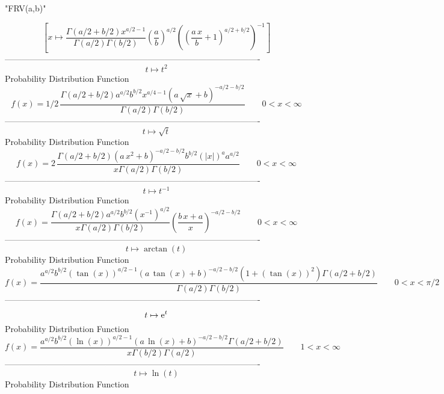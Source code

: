 \documentclass[12pt]{article}
\begin{document}
 
                                 "FRV(a,b)"

$$[x\mapsto {\frac {\Gamma \left( a/2+b/2 \right) {x}^{a/2-1}}{\Gamma
 \left( a/2 \right) \Gamma \left( b/2 \right) } \left( {\frac {a}{b}}
 \right) ^{a/2} \left(  \left( {\frac {a\,x}{b}}+1 \right) ^{a/2+b/2}
 \right) ^{-1}}]
$$-------------------------------------------------------------------------------------------  \\$$t\mapsto {t}^{2}
$$Probability Distribution Function 
$$  f(x)=1/2\,{\frac {\Gamma \left( a/2+b/2 \right) {a}^{a/2}{b}^{b/2}{x}^{a/4-
1} \left( a\,\sqrt {x}+b \right) ^{-a/2-b/2}}{\Gamma \left( a/2
 \right) \Gamma \left( b/2 \right) }}
 \qquad0
 < x < \infty 
$$-------------------------------------------------------------------------------------------  \\$$t\mapsto \sqrt {t}
$$Probability Distribution Function 
$$  f(x)=2\,{\frac {\Gamma \left( a/2+b/2 \right)  \left( a\,{x}^{2}+b \right) 
^{-a/2-b/2}{b}^{b/2} \left(  \left| x \right|  \right) ^{a}{a}^{a/2}}{
x\Gamma \left( a/2 \right) \Gamma \left( b/2 \right) }}
 \qquad0
 < x < \infty 
$$-------------------------------------------------------------------------------------------  \\$$t\mapsto {t}^{-1}
$$Probability Distribution Function 
$$  f(x)={\frac {\Gamma \left( a/2+b/2 \right) {a}^{a/2}{b}^{b/2} \left( {x}^{-
1} \right) ^{a/2}}{x\Gamma \left( a/2 \right) \Gamma \left( b/2
 \right) } \left( {\frac {b\,x+a}{x}} \right) ^{-a/2-b/2}}
 \qquad0
 < x < \infty 
$$-------------------------------------------------------------------------------------------  \\$$t\mapsto \arctan \left( t \right) 
$$Probability Distribution Function 
$$  f(x)={\frac {{a}^{a/2}{b}^{b/2} \left( \tan \left( x \right)  \right) ^{a/2
-1} \left( a\,\tan \left( x \right) +b \right) ^{-a/2-b/2} \left( 1+
 \left( \tan \left( x \right)  \right) ^{2} \right) \Gamma \left( a/2+
b/2 \right) }{\Gamma \left( a/2 \right) \Gamma \left( b/2 \right) }}
 \qquad0
 < x < \pi/2
$$-------------------------------------------------------------------------------------------  \\$$t\mapsto {{\rm e}^{t}}
$$Probability Distribution Function 
$$  f(x)={\frac {{a}^{a/2}{b}^{b/2} \left( \ln  \left( x \right)  \right) ^{a/2
-1} \left( a\,\ln  \left( x \right) +b \right) ^{-a/2-b/2}\Gamma
 \left( a/2+b/2 \right) }{x\Gamma \left( b/2 \right) \Gamma \left( a/2
 \right) }}
 \qquad1
 < x < \infty 
$$-------------------------------------------------------------------------------------------  \\$$t\mapsto \ln  \left( t \right) 
$$Probability Distribution Function 
\end{document}
